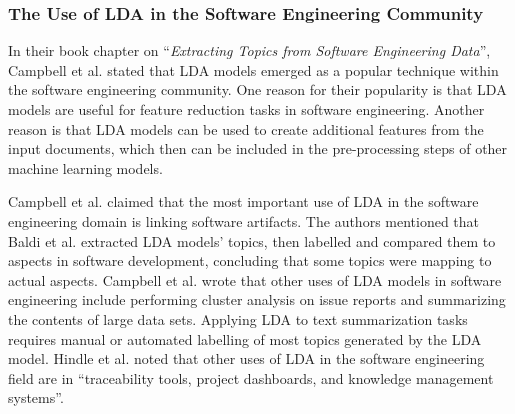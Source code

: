         
        \subsubsection{The Use of LDA in the Software Engineering Community}
            In their book chapter on ``\emph{Extracting Topics from Software Engineering Data}'', Campbell et al. \cite{campbell2015latent} stated that LDA models emerged as a popular technique within the software engineering community. One reason for their popularity is that LDA models are useful for feature reduction tasks in software engineering. Another reason is that LDA models can be used to create additional features from the input documents, which then can be included in the pre-processing steps of other machine learning models. 
            
            Campbell et al. \cite{campbell2015latent} claimed that the most important use of LDA in the software engineering domain is linking software artifacts. The authors mentioned that Baldi et al. \cite{baldi2008theory} extracted LDA models' topics, then labelled and compared them to aspects in software development, concluding that some topics were mapping to actual aspects. Campbell et al. \cite{campbell2015latent} wrote that other uses of LDA models in software engineering include performing cluster analysis on issue reports and summarizing the contents of large data sets. Applying LDA to text summarization tasks requires manual or automated labelling of most topics generated by the LDA model. Hindle et al. \cite{hindle2012relating} noted that other uses of LDA in the software engineering field are in ``traceability tools, project dashboards, and knowledge management systems''.
            
            
            
                
                
                
                
